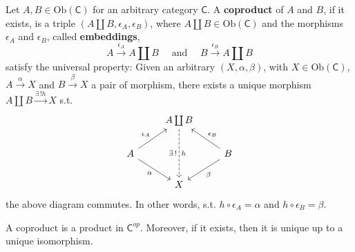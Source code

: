\begin{defn}[Coproduct]
	Let $A,B \in \mathrm{Ob} \left(\mathsf{C}\right)$ for an arbitrary category $\mathsf{C}$.
	A \textbf{coproduct} of $A$ and $B$, if it exists,
	is a triple $\left(A \coprod B, \epsilon_A, \epsilon_B \right)$,
	where $A \coprod B \in \mathrm{Ob} \left(\mathsf{C}\right)$
	and the morphisms $\epsilon_A$ and $\epsilon_B$, called \textbf{embeddings}, 
	\begin{equation}
	A \xrightarrow{\epsilon_A} A \coprod B \quad \text{ and } \quad B \xrightarrow{\epsilon_B} A \coprod B
	\end{equation} 
	satisfy the universal property:
	Given an arbitrary $\left(X, \alpha, \beta\right)$, with $X \in \mathrm{Ob} \left(\mathsf{C}\right)$, $A \xrightarrow{\alpha} X$ and $B \xrightarrow{\beta} X$ a pair of morphism, there exists a unique morphism $A \coprod B \xrightarrow{\exists\, ! h} X$ s.t.
	\begin{equation}
	\begin{tikzcd}
		& A \coprod B \arrow[ld, "\epsilon_A"', leftarrow] \arrow[rd, "\epsilon_B", leftarrow] \arrow[dd, "h", "\exists\, !"', dashrightarrow] \\
		A & & B\\
		  & X \arrow[lu, "\alpha", leftarrow] \arrow[ru, "\beta"', leftarrow] &
	\end{tikzcd}
	\end{equation} 
	the above diagram commutes.
	In other words, s.t. $h \circ \epsilon_A = \alpha$ and $h \circ \epsilon_B = \beta$.
\end{defn}

\begin{rem}
	A coproduct is a product in $\mathsf{C}^{op}$.
	Moreover, if it exists, then it is unique up to a unique isomorphism.
\end{rem}

